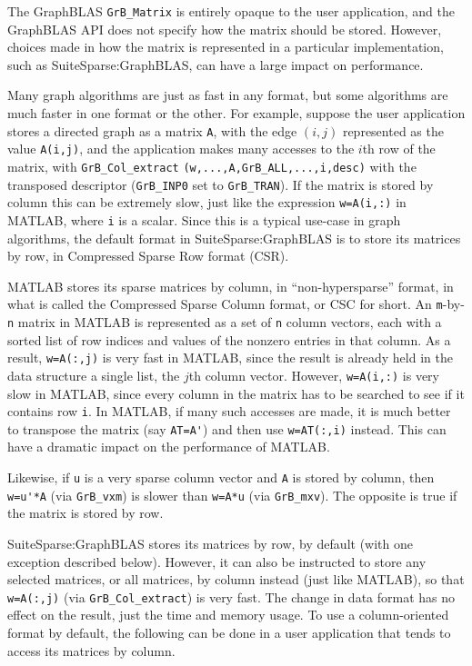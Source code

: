 The GraphBLAS \verb'GrB_Matrix' is entirely opaque to the user application, and
the GraphBLAS API does not specify how the matrix should be stored.  However,
choices made in how the matrix is represented in a particular implementation,
such as SuiteSparse:GraphBLAS, can have a large impact on performance.

Many graph algorithms are just as fast in any format, but some algorithms are
much faster in one format or the other.  For example, suppose the user
application stores a directed graph as a matrix \verb'A', with the edge $(i,j)$
represented as the value \verb'A(i,j)', and the application makes many accesses
to the $i$th row of the matrix, with \verb'GrB_Col_extract'
\verb'(w,...,A,GrB_ALL,...,i,desc)' with the transposed descriptor
(\verb'GrB_INP0' set to \verb'GrB_TRAN').  If the matrix is stored by column
this can be extremely slow, just like the expression \verb'w=A(i,:)' in MATLAB,
where \verb'i' is a scalar.  Since this is a typical use-case in graph
algorithms, the default format in SuiteSparse:GraphBLAS is to store its
matrices by row, in Compressed Sparse Row format (CSR).

MATLAB stores its sparse matrices by column, in ``non-hypersparse'' format, in
what is called the Compressed Sparse Column format, or CSC for short.  An
\verb'm'-by-\verb'n' matrix in MATLAB is represented as a set of \verb'n'
column vectors, each with a sorted list of row indices and values of the
nonzero entries in that column.  As a result, \verb'w=A(:,j)' is very fast in
MATLAB, since the result is already held in the data structure a single list,
the $j$th column vector.  However, \verb'w=A(i,:)' is very slow in MATLAB,
since every column in the matrix has to be searched to see if it contains row
\verb'i'.  In MATLAB, if many such accesses are made, it is much better to
transpose the matrix (say \verb"AT=A'") and then use \verb"w=AT(:,i)" instead.
This can have a dramatic impact on the performance of MATLAB.

Likewise, if \verb'u' is a very sparse column vector and \verb'A' is stored by
column, then \verb"w=u'*A" (via \verb'GrB_vxm') is slower than \verb'w=A*u'
(via \verb'GrB_mxv').  The opposite is true if the matrix is stored by row.

SuiteSparse:GraphBLAS stores its matrices by row, by default (with one
exception described below).  However, it can also be instructed to store any
selected matrices, or all matrices, by column instead (just like MATLAB), so
that \verb'w=A(:,j)' (via \verb'GrB_Col_extract') is very fast.  The change in
data format has no effect on the result, just the time and memory usage.  To
use a column-oriented format by default, the following can be done in a user
application that tends to access its matrices by column.

